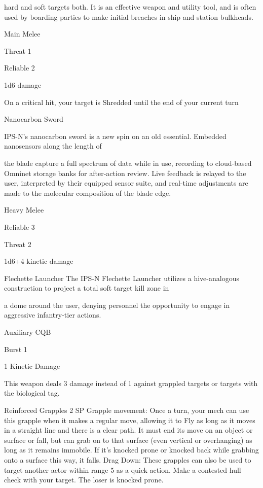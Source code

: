 hard and soft targets both. It is an effective weapon and utility tool, and is often used by boarding parties to  
make initial breaches in ship and station bulkheads.   

Main Melee
 
Threat 1
 
Reliable 2
 
1d6 damage
 
On a critical hit, your target is Shredded until the end of your current turn
 

Nanocarbon Sword  

IPS-N’s nanocarbon sword is a new spin on an old essential. Embedded nanosensors along the length of  

the blade capture a full spectrum of data while in use, recording to cloud-based Omninet storage banks for  
after-action review. Live feedback is relayed to the user, interpreted by their equipped sensor suite, and  
real-time adjustments are made to the molecular composition of the blade edge.  

Heavy Melee
 

                                                                                                                      


Reliable 3
 
Threat 2
 
1d6+4 kinetic damage
 

Flechette Launcher  
The IPS-N Flechette Launcher utilizes a hive-analogous construction to project a total soft target kill zone in  

a dome around the user, denying personnel the opportunity to engage in aggressive infantry-tier actions.   

Auxiliary CQB
 
Burst 1
 
1 Kinetic Damage
 
This weapon deals 3 damage instead of 1 against grappled targets or targets with the biological  
tag.
 

Reinforced Grapples  
2 SP  
Grapple movement: Once a turn, your mech can use this grapple when it makes a regular move,  
allowing it to Fly as long as it moves in a straight line and there is a clear path. It must end its  
move on an object or surface or fall, but can grab on to that surface (even vertical or overhanging)  
as long as it remains immobile. If it’s knocked prone or knocked back while grabbing onto a  
surface this way, it falls.  
Drag Down: These grapples can also be used to target another actor within range 5 as a quick  
action. Make a contested hull check with your target. The loser is knocked prone.
 

